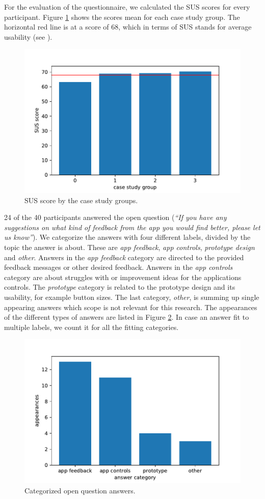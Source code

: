 \documentclass[11pt, a4paper]{article}
\begin{document}
			For the evaluation of the questionnaire, we calculated the \ac{SUS} scores for every participant. Figure \ref{fig:sus} shows the scores mean for each case study group. The horizontal red line is at a score of 68, which in terms of \ac{SUS} stands for average usability (see ).

			\begin{figure}[H]
				\centering
				\includegraphics[width=.49\textwidth]{img/plot/plot_sus.pdf}
				\caption{SUS score by the case study groups.}
				\label{fig:sus}
			\end{figure}

			24 of the 40 participants answered the open question (\emph{``If you have any suggestions on what kind of feedback from the app you would find better, please let us know''}). We categorize the answers with four different labels, divided by the topic the answer is about. These are \emph{app feedback}, \emph{app controls}, \emph{prototype design} and \emph{other}. Answers in the \emph{app feedback} category are directed to the provided feedback messages or other desired feedback. Answers in the \emph{app controls} category are about struggles with or improvement ideas for the applications controls. The \emph{prototype} category is related to the prototype design and its usability, for example button sizes. The last category, \emph{other}, is summing up single appearing answers which scope is not relevant for this research. The appearances of the different types of answers are listed in Figure \ref{fig:tags}. In case an answer fit to multiple labels, we count it for all the fitting categories.

			\begin{figure}[H]
				\centering
				\includegraphics[width=.49\textwidth]{img/plot/plot_tags.pdf}
				\caption{Categorized open question answers.}
				\label{fig:tags}
			\end{figure}
			
\end{document}
